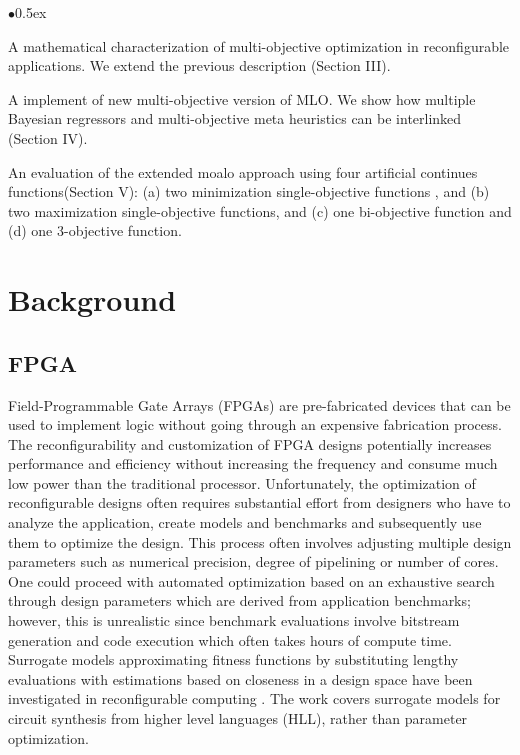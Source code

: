 \documentclass[12pt, runningheads,a4paper]{llncs}
\begin{document}
\vspace{-0.5em}

\begin{list}{$\bullet$}{\itemsep 0.5ex}

\item A mathematical characterization of multi-objective optimization in reconfigurable applications. We extend the previous description \cite{arc2012MLO} (Section III).

\item A implement of new multi-objective version of MLO. We show how multiple Bayesian regressors and multi-objective meta heuristics can be interlinked (Section IV).

\item An evaluation of the extended \ac{moalo} approach using four artificial continues functions(Section V): (a) two minimization single-objective functions  , and (b) two maximization single-objective functions, and (c) one bi-objective function  and (d) one 3-objective function.
\end{list}




\section{Background}
\subsection{FPGA}
 Field-Programmable Gate Arrays (FPGAs) are pre-fabricated devices that can be used to implement logic without going through an expensive fabrication process. The reconfigurability and customization of FPGA designs potentially increases performance and efficiency without increasing the frequency and consume much low power than the traditional processor. Unfortunately, the optimization of reconfigurable designs often requires substantial effort from designers who have to analyze the application, create models and benchmarks and subsequently use them to optimize the design. This process often involves adjusting multiple design parameters such as numerical precision, degree of pipelining or number of cores. One could proceed with automated optimization based on an exhaustive search through design parameters which are derived from application benchmarks; however, this is unrealistic since benchmark evaluations involve bitstream generation and code execution which often takes hours of compute time.
Surrogate models approximating fitness functions by substituting lengthy evaluations with estimations based on closeness in a design space have been investigated in reconfigurable computing \cite{Pilato2008}. The work covers surrogate models for circuit synthesis from higher level languages (HLL), rather than parameter optimization.
\end{document}
